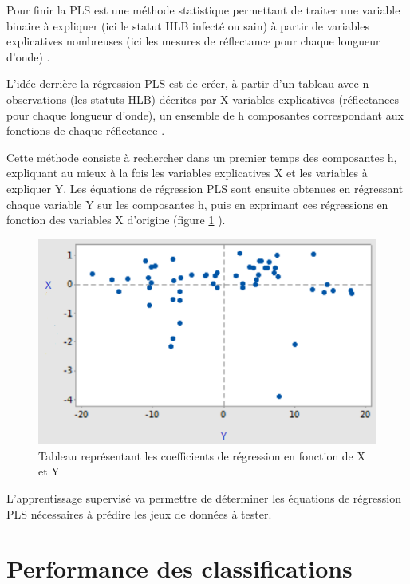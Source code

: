 \documentclass[
  11pt,
  french,
  a4paper,
  extrafontsizes,onecolumn,openright
  ]{memoir}
\begin{document}
Pour finir la PLS est une méthode statistique permettant de traiter une variable binaire à expliquer (ici le statut HLB infecté ou sain) à partir de variables explicatives nombreuses (ici les mesures de réflectance pour chaque longueur d'onde) \autocite{pls}.

L'idée derrière la régression PLS est de créer, à partir d'un tableau avec n observations (les statuts HLB) décrites par X variables explicatives (réflectances pour chaque longueur d'onde), un ensemble de h composantes correspondant aux fonctions de chaque réflectance \autocite{tenehaus_lapproche_1999}.

Cette méthode consiste à rechercher dans un premier temps des composantes h, expliquant au mieux à la fois les variables explicatives X et les variables à expliquer Y. Les équations de régression PLS sont ensuite obtenues en régressant chaque variable Y sur les composantes h, puis en exprimant ces régressions en fonction des variables X d'origine (figure \ref{fig:15} \autocite{tenehaus_lapproche_1999}).

\scriptsize

\begin{figure}

{\centering \includegraphics[width=0.8\linewidth]{Images/Figure15} 

}

\caption{Tableau représentant les coefficients de régression en fonction de X et Y}\label{fig:15}
\end{figure}

\normalsize

L'apprentissage supervisé va permettre de déterminer les équations de régression PLS nécessaires à prédire les jeux de données à tester.

\vfill
\newpage

\hypertarget{performance-des-classifications}{%
\section{Performance des classifications}\label{performance-des-classifications}}
\end{document}
